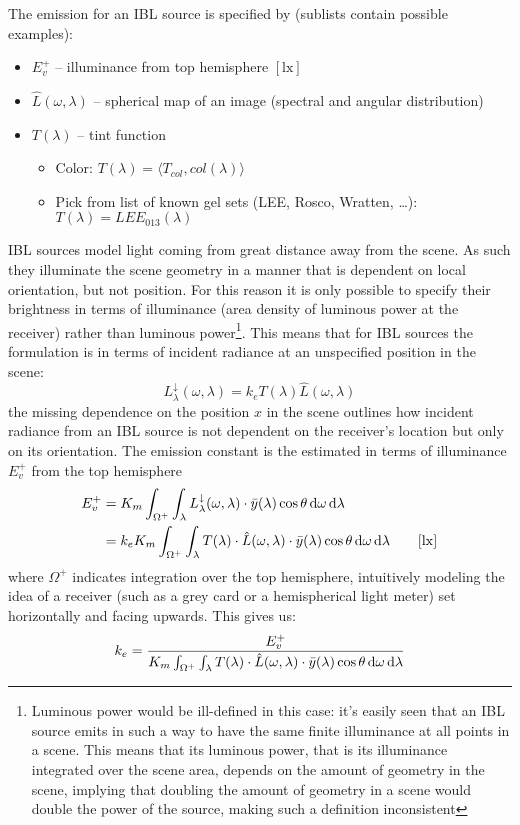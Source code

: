 The emission for an \gls{IBL} source is specified by (sublists contain possible examples):

\begin{itemize}
\item $E^+_v$ -- illuminance from top hemisphere $[\unit{\lux}]$
\item $\hat{L}(\omega,\lambda)$ -- spherical map of an image (spectral and angular distribution)
\item $T(\lambda)$ -- tint function
  \begin{itemize}\small\it
  \item Color: $T(\lambda) = \langle T_{col}, col(\lambda) \rangle$
  \item Pick from list of known gel sets (LEE, Rosco, Wratten, \ldots): $T(\lambda) = LEE_{013} (\lambda)$
  \end{itemize}
\end{itemize}
\Gls{IBL} sources model light coming from great distance away from the scene. As
such they illuminate the scene geometry in a manner that is dependent on
local orientation, but not position. For this reason it is only possible to
specify their brightness in terms of illuminance (area density of luminous power
at the receiver) rather than luminous power\footnote{Luminous power would be
ill-defined in this case: it's easily seen that an \gls{IBL} source emits in
such a way to have the same finite illuminance at all points in a scene. This
means that its luminous power, that is its illuminance integrated over the scene
area, depends on the amount of geometry in the scene, implying that doubling the
amount of geometry in a scene would double the power of the source, making
such a definition inconsistent}.
This means that for \gls{IBL} sources the formulation is in terms of incident
radiance at an unspecified position in the scene:
\begin{equation}
L_{\lambda}^\downarrow(\omega,\lambda) = k_e T(\lambda) \hat{L}(\omega,\lambda)
\end{equation}
the missing dependence on the position $x$ in the scene outlines how incident
radiance from an \gls{IBL} source is not dependent on the receiver's location
but only on its orientation. The emission constant is the estimated in terms of
illuminance $E^+_v$ from the top hemisphere
\begin{align*}
E^+_v &= K_m \int_{\Omega^+} \int_\lambda L_{\lambda}^\downarrow(\omega,\lambda)
\cdot\bar y(\lambda) \cos\theta \d\omega\d\lambda \\
&= k_e K_m\int_{\Omega^+}\int_{\lambda} T(\lambda) \cdot \hat{L}(\omega,\lambda)
\cdot\bar y(\lambda) \cos\theta \d\omega\d\lambda
\qquad [\unit{\lux}]
\end{align*}
where $\Omega^+$ indicates integration over the top hemisphere, intuitively
modeling the idea of a receiver (such as a grey card or a hemispherical light
meter) set horizontally and facing upwards. This gives us:
\begin{equation}
k_e = \frac{E^+_v}{K_m\int_{\Omega^+}\int_{\lambda} T(\lambda) \cdot
\hat{L}(\omega,\lambda) \cdot \bar y(\lambda)\cos\theta \mathop{}\!\mathrm{d}\omega\mathop{}\!\mathrm{d}\lambda}
\end{equation}

